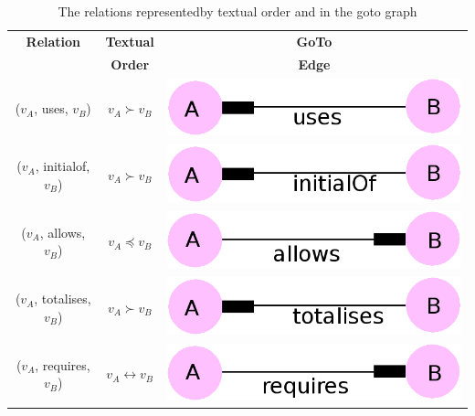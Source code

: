 \begin{table}[H]
\centering
\begin{tabular}{| c | c | c |}
\hline
\textbf{Relation} & \textbf{Textual} & \textbf{GoTo} \\
& \textbf{Order} & \textbf{Edge} \\
\hline
($v_{A}$, uses, $v_{B}$) & $v_{A} \succ v_{B}$ &
\includegraphics[scale=0.15]{Figures/Formalising/uses.png} \\
\hline
($v_{A}$, initialof, $v_{B}$) & $v_{A} \succ v_{B}$  &
\includegraphics[scale=0.15]{Figures/Formalising/initialof.png} \\
\hline
($v_{A}$, allows, $v_{B}$) & $v_{A} \preceq v_{B}$ &
\includegraphics[scale=0.15]{Figures/Formalising/allows.png} \\
\hline
($v_{A}$, totalises, $v_{B}$) & $v_{A} \succ v_{B}$ &
\includegraphics[scale=0.15]{Figures/Formalising/totalises.png} \\
\hline
($v_{A}$, requires, $v_{B}$) & $v_{A} \leftrightarrow v_{B}$ &
\includegraphics[scale=0.15]{Figures/Formalising/requires.png} \\
\hline
\end{tabular}
\caption{The relations representedby textual order and in the goto graph \label{tab:gotorelations}}
\end{table}

